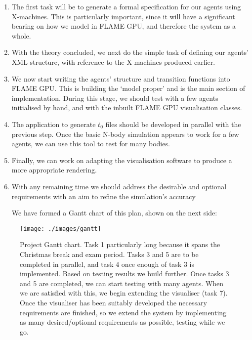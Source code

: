 \documentclass[11pt,a4paper]{article}
\begin{document}
\begin{enumerate}
\item The first task will be to generate a formal specification for our agents using X-machines. This is particularly important, since it will have a significant bearing on how we model in FLAME GPU, and therefore the system as a whole.
\item With the theory concluded, we next do the simple task of defining our agents' XML structure, with reference to the X-machines produced earlier.
\item We now start writing the agents' structure and transition functions into FLAME GPU. This is building the `model proper' and is the main section of implementation. During this stage, we should test with a few agents initialised by hand, and with the inbuilt FLAME GPU visualisation classes.
\item The application to generate $t_0$ files should be developed in parallel with the previous step. Once the basic N-body simulation appears to work for a few agents, we can use this tool to test for many bodies.
\item Finally, we can work on adapting the visualisation software to produce a more appropriate rendering.
\item With any remaining time we should address the desirable and optional requirements with an aim to refine the simulation's accuracy

We have formed a Gantt chart of this plan, shown on the next side:
\end{enumerate}

\begin{SCfigure}
\texttt{[image: ./images/gantt]}
\caption[Project work Gantt chart]{Project Gantt chart. Task 1 particularly long because it spans the Christmas break and exam period. Tasks 3 and 5 are to be completed in parallel, and task 4 once enough of task 3 is implemented. Based on testing results we build further. Once tasks 3 and 5 are completed, we can start testing with many agents. When we are satisfied with this, we begin extending the visualiser (task 7). Once the visualiser has been suitably developed the necessary requirements are finished, so we extend the system by implementing as many desired/optional requirements as possible, testing while we go.}
\label{gantt}
\end{SCfigure}

%
%
\end{document}
